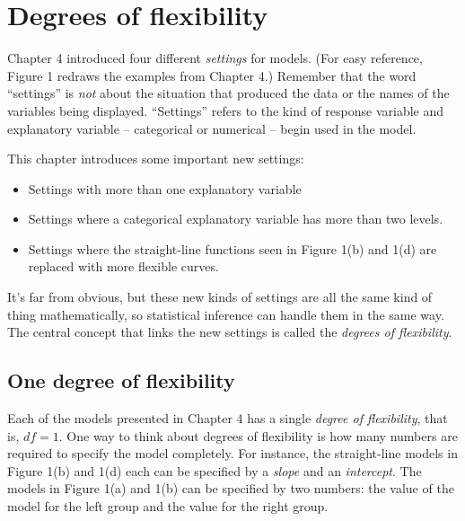 \documentclass[]{tufte-book}
\providecommand{\tightlist}{%
  \setlength{\itemsep}{0pt}\setlength{\parskip}{0pt}}
\begin{document}
\hypertarget{degrees-of-flexibility}{%
\chapter{Degrees of flexibility}\label{degrees-of-flexibility}}

Chapter 4 introduced four different \emph{settings} for models. (For easy reference, Figure 1 redraws the examples from Chapter 4.) Remember that the word ``settings'' is \emph{not} about the situation that produced the data or the names of the variables being displayed. ``Settings'' refers to the kind of response variable and explanatory variable -- categorical or numerical -- begin used in the model.

This chapter introduces some important new settings:

\begin{itemize}
\tightlist
\item
  Settings with more than one explanatory variable
\item
  Settings where a categorical explanatory variable has more than two levels.
\item
  Settings where the straight-line functions seen in Figure 1(b) and 1(d) are replaced with more flexible curves.
\end{itemize}

It's far from obvious, but these new kinds of settings are all the same kind of thing mathematically, so statistical inference can handle them in the same way. The central concept that links the new settings is called the \emph{degrees of flexibility}.

\hypertarget{one-degree-of-flexibility}{%
\section{One degree of flexibility}\label{one-degree-of-flexibility}}

Each of the models presented in Chapter 4 has a single \emph{degree of flexibility}, that is, \(df = 1\). One way to think about degrees of flexibility is how many numbers are required to specify the model completely. For instance, the straight-line models in Figure 1(b) and 1(d) each can be specified by a \emph{slope} and an \emph{intercept}. The models in Figure 1(a) and 1(b) can be specified by two numbers: the value of the model for the left group and the value for the right group.
\end{document}
